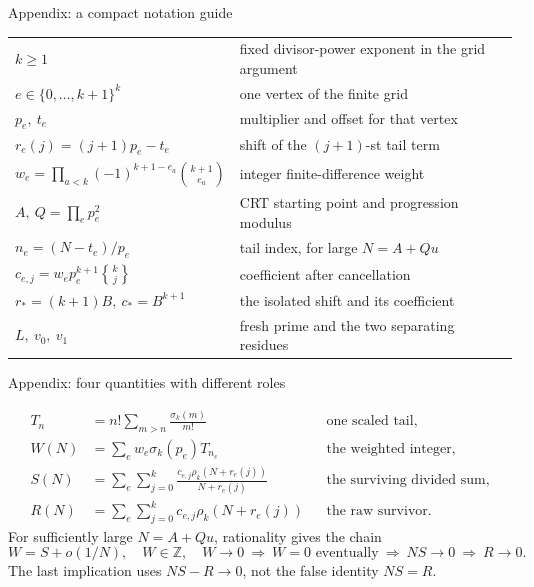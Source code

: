 \documentclass[11pt,aspectratio=169]{beamer}
\newcommand{\Z}{\mathbb{Z}}
\newcommand{\stir}[2]{\genfrac{\{}{\}}{0pt}{}{#1}{#2}}
\begin{document}
\begin{frame}{Appendix: a compact notation guide}

\small
\begin{center}
\renewcommand{\arraystretch}{1.35}
\begin{tabular}{@{}ll@{}}
\toprule
$k\ge1$ & fixed divisor-power exponent in the grid argument\\
$e\in\{0,\ldots,k+1\}^k$ & one vertex of the finite grid\\
$p_e,\ t_e$ & multiplier and offset for that vertex\\
$r_e(j)=(j+1)p_e-t_e$ & shift of the $(j+1)$-st tail term\\
$w_e=\prod_{a<k}(-1)^{k+1-e_a}\binom{k+1}{e_a}$ & integer finite-difference weight\\
$A,\ Q=\prod_e p_e^2$ & CRT starting point and progression modulus\\
$n_e=(N-t_e)/p_e$ & tail index, for large $N=A+Qu$\\
$c_{e,j}=w_ep_e^{k+1}\stir{k}{j}$ & coefficient after cancellation\\
$r_*=(k+1)B,\ c_*=B^{k+1}$ & the isolated shift and its coefficient\\
$L,\ v_0,\ v_1$ & fresh prime and the two separating residues\\
\bottomrule
\end{tabular}
\end{center}

\end{frame}


\begin{frame}{Appendix: four quantities with different roles}

\small
\begin{align*}
 T_n&=n!\sum_{m>n}\frac{\sigma_k(m)}{m!}
 &&\text{one scaled tail},\\[3pt]
 W(N)&=\sum_e w_e\sigma_k(p_e)T_{n_e}
 &&\text{the weighted integer},\\[3pt]
 S(N)&=\sum_e\sum_{j=0}^k
     \frac{c_{e,j}\rho_k(N+r_e(j))}{N+r_e(j)}
 &&\text{the surviving divided sum},\\[3pt]
 R(N)&=\sum_e\sum_{j=0}^k c_{e,j}\rho_k(N+r_e(j))
 &&\text{the raw survivor}.
\end{align*}
For sufficiently large $N=A+Qu$, rationality gives the chain
\[
 W=S+o(1/N),\quad W\in\Z,\quad W\to0
 \ \Longrightarrow\ W=0\text{ eventually}
 \ \Longrightarrow\ NS\to0
 \ \Longrightarrow\ R\to0.
\]
The last implication uses $NS-R\to0$, not the false identity $NS=R$.

\end{frame}
\end{document}
